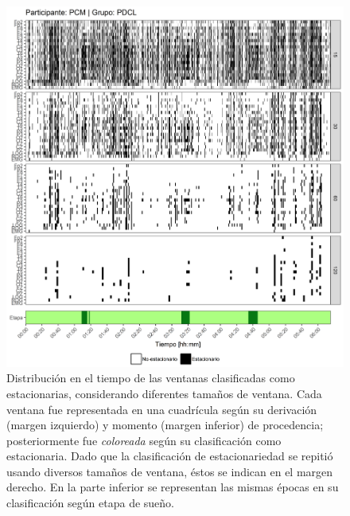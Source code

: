 \begin{figure}
\centering
\includegraphics[width=\linewidth]
{./scripts_graf_res/PCM_patrones_2.png}
\caption[Distribución en el tiempo de las ventanas clasificadas como estacionarias, considerando diferentes tamaños de ventana]{Distribución en el tiempo de las ventanas clasificadas como estacionarias, considerando diferentes tamaños de ventana. 
Cada ventana fue representada en una cuadrícula según su derivación (margen izquierdo) y momento (margen inferior) de procedencia; posteriormente fue \textit{coloreada} según su clasificación como estacionaria.
Dado que la clasificación de estacionariedad se repitió usando diversos tamaños de ventana, éstos se indican en el margen derecho.
En la parte inferior se representan las mismas épocas en su clasificación según etapa de sueño.}
\end{figure}


